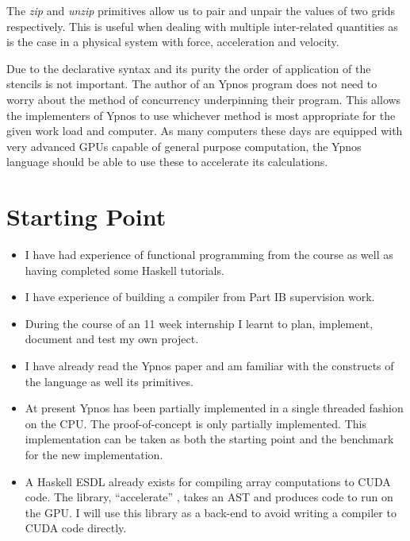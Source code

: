 The \emph{zip} and \emph{unzip} primitives allow us to pair and unpair the 
values of two grids respectively. This is useful when dealing with multiple 
inter-related quantities as is the case in a physical system with force, 
acceleration and velocity.

Due to the declarative syntax and its purity the order of application of the 
stencils is not important. The author of an Ypnos program does not need to 
worry about the method of concurrency underpinning their program. This allows 
the implementers of Ypnos to use whichever method is most appropriate for the 
given work load and computer. As many computers these days are equipped with 
very advanced GPUs capable of general purpose computation, the Ypnos language 
should be able to use these to accelerate its calculations.

\section*{Starting Point}

\begin{itemize}

\item I have had experience of functional programming from the course as well 
as having completed some Haskell tutorials. 

\item I have experience of building a compiler from Part IB supervision work.

\item During the course of an 11 week internship I learnt to plan, implement, 
document and test my own project.

\item I have already read the Ypnos paper and am familiar with the constructs 
of the language as well its primitives.

\item At present Ypnos has been partially implemented in a single threaded 
fashion on the CPU. The proof-of-concept is only partially implemented. This 
implementation can be taken as both the starting point and the benchmark for 
the new implementation.

\item A Haskell ESDL already exists for compiling array computations to CUDA 
code. The library, ``accelerate'' \cite{accel}, takes an AST and produces code
to run on the GPU.  I will use this library as a back-end to avoid writing a 
compiler to CUDA code directly.

\end{itemize}

